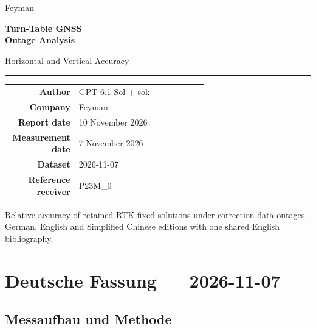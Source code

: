 \documentclass[11pt,a4paper]{article}
\numberwithin{equation}{section}
\numberwithin{figure}{section}
\begin{document}
\hypersetup{pageanchor=false}
\begin{titlepage}
\centering
\vspace*{15mm}
{\Large\sffamily\color{reportblue} Feyman\par}
\vspace{22mm}
{\Huge\bfseries\color{reportblue} Turn-Table GNSS\\[5mm]Outage Analysis\par}
\vspace{8mm}
{\Large Horizontal and Vertical Accuracy\par}
\vspace{12mm}
{\color{reportblue}\rule{0.8\linewidth}{1pt}\par}
\vspace{12mm}
\begin{tabular}{rp{0.65\linewidth}}
\textbf{Author} & GPT-6.1-Sol + sok\\[7pt]
\textbf{Company} & Feyman\\[7pt]
\textbf{Report date} & 10 November 2026\\[7pt]
\textbf{Measurement date} & 7 November 2026\\[7pt]
\textbf{Dataset} & 2026-11-07\\[7pt]
\textbf{Reference receiver} & P23M\_0\\[7pt]
\end{tabular}
\vfill
\begin{minipage}{0.87\linewidth}\centering\small
Relative accuracy of retained RTK-fixed solutions under correction-data outages.
German, English and Simplified Chinese editions with one shared English bibliography.
\end{minipage}
\vspace{15mm}
\end{titlepage}
\hypersetup{pageanchor=true}
\setcounter{tocdepth}{2}
\makeatletter
\renewcommand*\l@subsection{\@dottedtocline{2}{1.5em}{3.2em}}
\makeatother
\renewcommand{\contentsname}{Contents / Inhaltsverzeichnis / {\cjkfont 目录}}
{\small\tableofcontents}
\clearpage
{}
\clearpage\section{Deutsche Fassung — 2026-11-07}

\subsection{Messaufbau und Methode}
\end{document}

